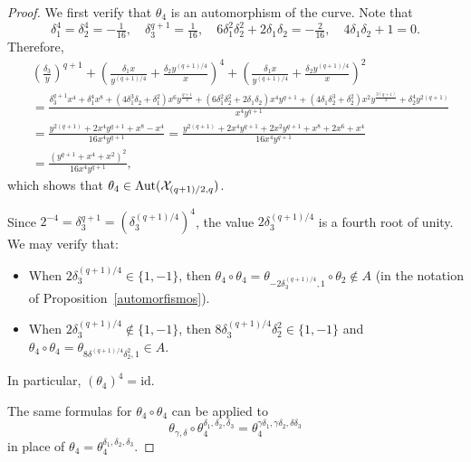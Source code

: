 \documentclass[12pt]{amsart}
\theoremstyle{remark}
\theoremstyle{definition}
\def\Aut{{\rm Aut}}
\begin{document}
\begin{proof}
    We first verify that $\theta_4$ is an automorphism of the curve. Note that
    $$\delta_1^4 = \delta_2^4 = -\tfrac{1}{16}, \quad
      \delta_3^{q+1} = \tfrac{1}{16}, \quad
      6\delta_1^2\delta_2^2 + 2\delta_1\delta_2 = -\tfrac{2}{16}, \quad
      4\delta_1\delta_2 + 1 = 0.$$
    Therefore,
    \begin{align*}
        &\left(\frac{\delta_3}{y}\right)^{q+1}
         + \left(\frac{\delta_1x}{y^{(q+1)/4}}
                 + \frac{\delta_2y^{(q+1)/4}}{x}\right)^4
         + \left(\frac{\delta_1x}{y^{(q+1)/4}}
                 + \frac{\delta_2y^{(q+1)/4}}{x}\right)^2 \\
        &= \frac{\delta_3^{q+1}x^4 + \delta_1^4x^8
                 + (4\delta_1^3\delta_2 + \delta_1^2)x^6y^{\frac{q+1}{2}}
                 + (6\delta_1^2\delta_2^2 + 2\delta_1\delta_2)x^4y^{q+1}
                 + (4\delta_1\delta_2^3 + \delta_2^2)x^2y^{\frac{3(q+1)}{2}}
                 + \delta_2^4y^{2(q+1)}}
               {x^4y^{q+1}} \\
        &= \frac{y^{2(q+1)}+2x^4y^{q+1}+x^8-x^4}{16x^4y^{q+1}}
         = \frac{y^{2(q+1)}+2x^4y^{q+1}+2x^2y^{q+1}+x^8+2x^6+x^4}
               {16x^4y^{q+1}} \\
        &= \frac{(y^{q+1}+x^4+x^2)^2}{16x^4y^{q+1}},
    \end{align*}
    which shows that $\theta_4 \in \Aut(\mathcal{X}_{(q+1)/2,q})$.

    Since $2^{-4} = \delta_3^{q+1} = (\delta_3^{(q+1)/4})^4$, the value $2\delta_3^{(q+1)/4}$ is a fourth root of unity. We may verify that:
    \begin{itemize}
    \item
    When $2\delta_3^{(q+1)/4} \in \{1,-1\}$, then $\theta_4\circ \theta_4 = \theta_{-2\delta_3^{(q+1)/4}, 1} \circ \theta_2 \notin A$ (in the notation of Proposition~\ref{automorfismos}).
    \item
    When $2\delta_3^{(q+1)/4} \notin \{1,-1\}$, then $8\delta_3^{(q+1)/4}\delta_2^2 \in \{1,-1\}$ and $\theta_4\circ \theta_4 = \theta_{8\delta^{(q+1)/4}\delta_2^2, 1} \in A$.
    \end{itemize}
In particular, $(\theta_4)^4 = \mathrm{id}$.

    The same formulas for $\theta_4 \circ \theta_4$ can be applied to
    $$
    \theta_{\gamma,\delta} \circ \theta_4^{\delta_1,\delta_2,\delta_3} = \theta_4^{\gamma\delta_1,\gamma\delta_2,\delta\delta_3}
    $$
    in place of $\theta_4 = \theta_4^{\delta_1,\delta_2,\delta_3}$.


\end{proof}
\end{document}
